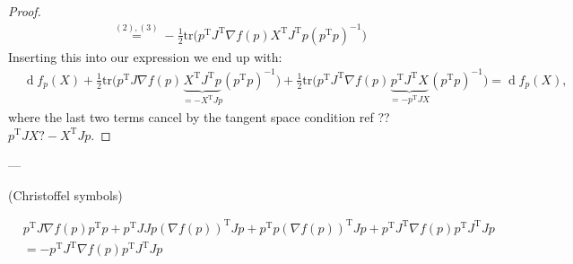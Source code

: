 \begin{proof}
\begin{align}
    &\overset{(2),(3)}{=}-\tfrac{1}{2} \mathrm{tr}\big(p ^{\mathrm{T}}J ^{\mathrm{T}} \nabla f(p)X ^{\mathrm{T}}J ^{\mathrm{T}}p(p ^{\mathrm{T}}p)^{-1}\big)
    \end{align}
    Inserting this into our expression we end up with:
    \begin{align}
    & \operatorname{d}f_{p}(X)+\tfrac{1}{2} \mathrm{tr}\big(p ^{\mathrm{T}}J \nabla f(p)\underbrace{X ^{\mathrm{T}}J ^{\mathrm{T}}p}_{=-X ^{\mathrm{T}}Jp}(p ^{\mathrm{T}}p)^{-1}\big)+\tfrac{1}{2}\mathrm{tr}\big(p ^{\mathrm{T}}J ^{\mathrm{T}}\nabla f(p) \underbrace{p ^{\mathrm{T}}J ^{\mathrm{T}}X}_{=-p^ {\mathrm{T}}JX}(p ^{\mathrm{T}}p)^{-1}\big)=\operatorname{d}f_{p}(X),
    \end{align}
    where the last two terms cancel by the tangent space condition ref ?? $p ^{\mathrm{T}}JX?-X ^{\mathrm{T}}Jp$.
\end{proof}




---

(Christoffel symbols)

\begin{align}
    &p^{\mathrm{T}}J\nabla f(p)p^{\mathrm{T}}p+p^{\mathrm{T}}JJp(\nabla f(p))^{\mathrm{T}}Jp+p^{\mathrm{T}}p(\nabla f(p))^{\mathrm{T}}Jp+p^{\mathrm{T}}J^{\mathrm{T}}\nabla f(p)p^{\mathrm{T}}J^{\mathrm{T}}Jp\\
    &= -p^{\mathrm{T}}J^{\mathrm{T}}\nabla f(p)p^{\mathrm{T}}J^{\mathrm{T}}Jp
\end{align}


